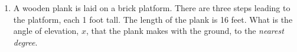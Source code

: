 \documentclass[12pt, twoside]{article}
\begin{document}
\begin{enumerate}
  \item A wooden plank is laid on a brick platform. There are three steps leading to the platform, each 1 foot tall. The length of the plank is 16 feet. What is the angle of elevation, $x$, that the plank makes with the ground, to the \emph{nearest degree}.\\[1.cm]
         \vspace{5cm}

  \end{enumerate}
  \newpage
  \setcounter{page}{1}
\end{document}
